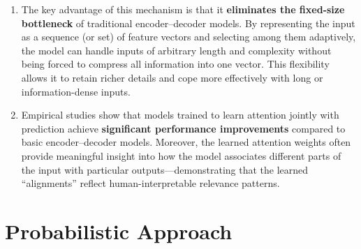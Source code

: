 \begin{enumerate}
    \item The key advantage of this mechanism is that it \textbf{eliminates the fixed-size bottleneck} of traditional encoder–decoder models.
    By representing the input as a sequence (or set) of feature vectors and selecting among them adaptively, the model can handle inputs of arbitrary length and complexity without being forced to compress all information into one vector.
    This flexibility allows it to retain richer details and cope more effectively with long or information-dense inputs.
    \hfill \cite{arxiv/1409.0473/NMT-Jointly-Learning-Align-Translate, common/online/chatgpt}

    \item Empirical studies show that models trained to learn attention jointly with prediction achieve \textbf{significant performance improvements} compared to basic encoder–decoder models.
    Moreover, the learned attention weights often provide meaningful insight into how the model associates different parts of the input with particular outputs—demonstrating that the learned “alignments” reflect human-interpretable relevance patterns.
    \hfill \cite{arxiv/1409.0473/NMT-Jointly-Learning-Align-Translate, common/online/chatgpt}
\end{enumerate}




\section{Probabilistic Approach}

